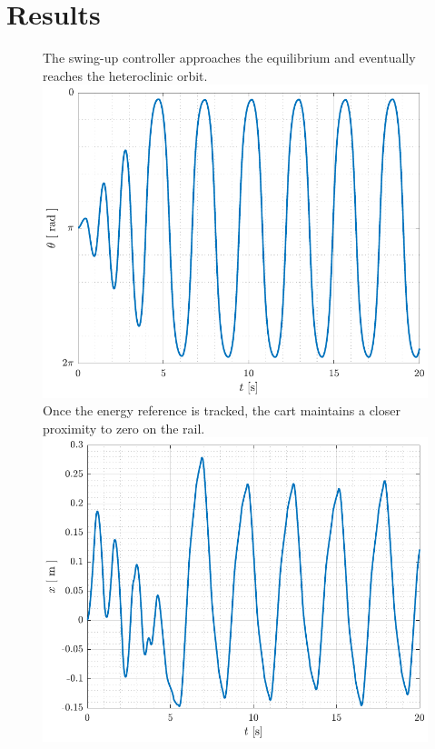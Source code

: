 \chapter{Results}

%
%
\begin{figure}[H]
  \hspace{1cm}
  \captionbox
  {
    The swing-up controller approaches the equilibrium and eventually reaches the heteroclinic orbit.
    \label{fig:theta_swing_p00}
  }
  {
    \hspace{-1cm}
    \includegraphics[width=.39\textwidth]{figures/theta_swing_p00}
  }
  \hspace{20pt}
  \captionbox 
  {
    Once the energy reference is tracked, the cart maintains a closer proximity to zero on the rail.
    \label{fig:x_swing_p00}
  }
  {
    \hspace{-1cm}
    \includegraphics[width=.4\textwidth]{figures/x_swing_p00}
  }  
\end{figure}

